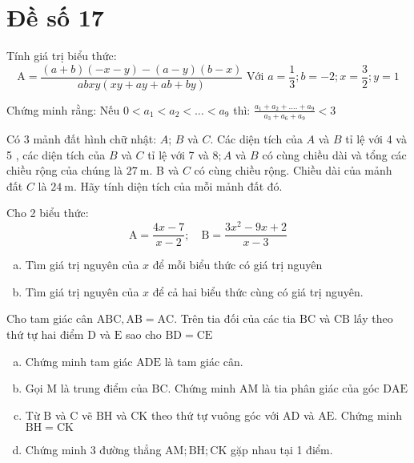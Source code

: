 \onehalfspacing
\section{Đề số 17}
\graphicspath{{./img/}}
\begin{bt} 
    Tính giá trị biểu thức:
$$
\mathrm{A}=\frac{(a+b)(-x-y)-(a-y)(b-x)}{a b x y(x y+a y+a b+b y)} \text { Với } a=\frac{1}{3} ; b=-2 ; x=\frac{3}{2} ; y=1
$$
	\loigiai{} 
\end{bt}

\begin{bt}
	Chứng minh rằng: Nếu $0<a_1<a_2<\ldots<a_9$ thì: $\frac{a_1+a_2+\ldots .+a_9}{a_3+a_6+a_9}<3$
	\loigiai{} 
\end{bt}

\begin{bt}
	Có 3 mảnh đất hình chữ nhật: $A$; $B$ và $C$. Các diện tích của $A$ và $B$ tỉ lệ với 4 và 5 , các diện tích của $B$ và $C$ tỉ lệ với 7 và $8 ; A$ và $B$ có cùng chiều dài và tổng các chiều rộng của chúng là $27 \mathrm{~m}$. B và $C$ có cùng chiều rộng. Chiều dài của mảnh đất $C$ là $24 \mathrm{~m}$. Hãy tính diện tích của mỗi mảnh đất đó.
	\loigiai{}
\end{bt}

\begin{bt}
    Cho 2 biểu thức:
$$
\mathrm{A}=\frac{4 x-7}{x-2} ; \quad \mathrm{B}=\frac{3 x^2-9 x+2}{x-3}
$$
    \begin{enumerate}[a.]
        \item Tìm giá trị nguyên của $x$ để mỗi biểu thức có giá trị nguyên
        \item Tìm giá trị nguyên của $x$ để cả hai biểu thức cùng có giá trị nguyên.
    \end{enumerate}
\loigiai{}
\end{bt}

\begin{bt}
    Cho tam giác cân $\mathrm{ABC}, \mathrm{AB}=\mathrm{AC}$. Trên tia đối của các tia $\mathrm{BC}$ và $\mathrm{CB}$ lấy theo thứ tự hai điểm $\mathrm{D}$ và $\mathrm{E}$ sao cho $\mathrm{BD}=\mathrm{CE}$
    \begin{enumerate}[a.]
        \item Chứng minh tam giác $\mathrm{ADE}$ là tam giác cân.
        \item Gọi $\mathrm{M}$ là trung điểm của $\mathrm{BC}$. Chứng minh $\mathrm{AM}$ là tia phân giác của góc $\mathrm{DAE}$
        \item Từ $\mathrm{B}$ và $\mathrm{C}$ vẽ $\mathrm{BH}$ và $\mathrm{CK}$ theo thứ tự vuông góc với $\mathrm{AD}$ và $\mathrm{AE}$. Chứng minh $\mathrm{BH}=\mathrm{CK}$
        \item Chứng minh 3 đường thẳng $\mathrm{AM} ; \mathrm{BH} ; \mathrm{CK}$ gặp nhau tại 1 điểm.
    \end{enumerate}
\loigiai{}
\end{bt}

